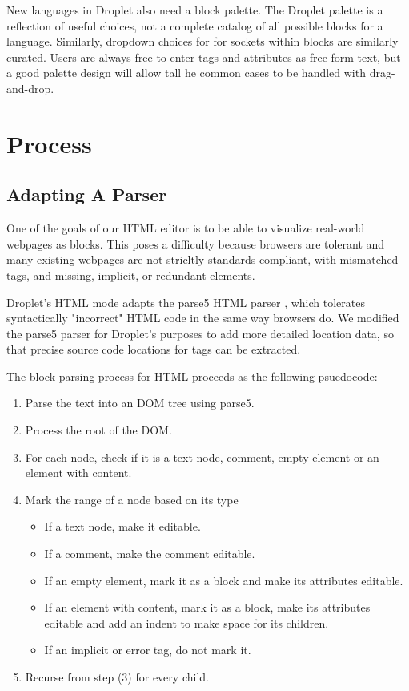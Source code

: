 \documentclass[conference]{IEEEtran}
\begin{document}
New languages in Droplet also need a block palette.  The Droplet palette is a reflection of useful choices, not a complete catalog of all possible blocks for a language.  Similarly, dropdown choices for for sockets within blocks are similarly curated.  Users are always free to enter tags and attributes as free-form text, but a good palette design will allow tall he common cases to be handled with drag-and-drop.

\section{Process}

\subsection{Adapting A Parser}

One of the goals of our HTML editor is to be able to visualize real-world webpages as blocks. This poses a difficulty because browsers are tolerant and many existing webpages are not stricltly standards-compliant, with mismatched tags, and missing, implicit, or redundant elements.

Droplet's HTML mode adapts the parse5 HTML parser \cite{parse5}, which tolerates syntactically "incorrect" HTML code in the same way browsers do. We modified the parse5 parser for Droplet's purposes to add more detailed location data, so that precise source code locations for tags can be extracted.

The block parsing process for HTML proceeds as the following psuedocode:
\begin{enumerate}
  \item Parse the text into an DOM tree using parse5.
  \item Process the root of the DOM.
  \item For each node, check if it is a text node, comment, empty element or an element with content.
  \item Mark the range of a node based on its type
  \begin{itemize}
    \item If a text node, make it editable.
    \item If a comment, make the comment editable.
    \item If an empty element, mark it as a block and make its attributes editable.
    \item If an element with content, mark it as a block, make its attributes editable and add an indent to make space for its children.
    \item If an implicit or error tag, do not mark it.
  \end{itemize}
  \item Recurse from step (3) for every child.
\end{enumerate}
\end{document}
